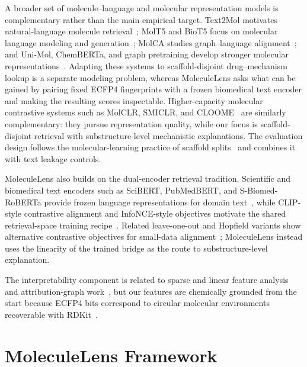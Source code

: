 \documentclass{article}
\begin{document}
A broader set of molecule--language and molecular representation models is complementary rather than the main empirical target. Text2Mol motivates natural-language molecule retrieval~\citep{edwards2021text2mol}; MolT5 and BioT5 focus on molecular language modeling and generation~\citep{edwards2022molt5,pei2023biot5}; MolCA studies graph--language alignment~\citep{liu2023molca}; and Uni-Mol, ChemBERTa, and graph pretraining develop stronger molecular representations~\citep{zhou2023unimol,chithrananda2020chemberta,hu2020pretraining}. Adapting these systems to scaffold-disjoint drug--mechanism lookup is a separate modeling problem, whereas MoleculeLens asks what can be gained by pairing fixed ECFP4 fingerprints with a frozen biomedical text encoder and making the resulting scores inspectable. Higher-capacity molecular contrastive systems such as MolCLR, SMICLR, and CLOOME~\citep{wang2022molclr,pinheiro2022smiclr,sanchezfernandez2023cloome} are similarly complementary: they pursue representation quality, while our focus is scaffold-disjoint retrieval with substructure-level mechanistic explanations. The evaluation design follows the molecular-learning practice of scaffold splits~\citep{bemis1996frameworks} and combines it with text leakage controls.

MoleculeLens also builds on the dual-encoder retrieval tradition. Scientific and biomedical text encoders such as SciBERT, PubMedBERT, and S-Biomed-RoBERTa provide frozen language representations for domain text~\citep{beltagy2019scibert,gu2021pubmedbert,deka2021sbiomed}, while CLIP-style contrastive alignment and InfoNCE-style objectives motivate the shared retrieval-space training recipe~\citep{radford2021clip,oord2018infonce}. Related leave-one-out and Hopfield variants show alternative contrastive objectives for small-data alignment~\citep{poole2019variational,furst2022cloob}; MoleculeLens instead uses the linearity of the trained bridge as the route to substructure-level explanation.

The interpretability component is related to sparse and linear feature analysis~\citep{bricken2023monosemanticity,templeton2024monosemanticity} and attribution-graph work~\citep{lindsey2025attribution}, but our features are chemically grounded from the start because ECFP4 bits correspond to circular molecular environments~\citep{rogers2010ecfp} recoverable with RDKit~\citep{rdkit}.

\section{MoleculeLens Framework}
\label{sec:framework}
\end{document}
